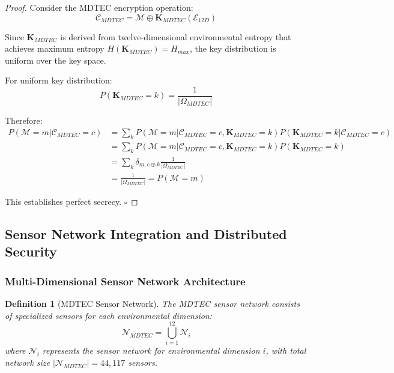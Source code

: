 \documentclass[12pt,a4paper]{article}
\newtheorem{definition}{Definition}
\begin{document}
\begin{proof}
Consider the MDTEC encryption operation:
\begin{equation}
\mathcal{C}_{MDTEC} = \mathcal{M} \oplus \mathbf{K}_{MDTEC}(\mathcal{E}_{12D})
\end{equation}

Since $\mathbf{K}_{MDTEC}$ is derived from twelve-dimensional environmental entropy that achieves maximum entropy $H(\mathbf{K}_{MDTEC}) = H_{max}$, the key distribution is uniform over the key space.

For uniform key distribution:
\begin{equation}
P(\mathbf{K}_{MDTEC} = k) = \frac{1}{|\Omega_{MDTEC}|}
\end{equation}

Therefore:
\begin{align}
P(\mathcal{M} = m | \mathcal{C}_{MDTEC} = c) &= \sum_{k} P(\mathcal{M} = m | \mathcal{C}_{MDTEC} = c, \mathbf{K}_{MDTEC} = k) P(\mathbf{K}_{MDTEC} = k | \mathcal{C}_{MDTEC} = c) \\
&= \sum_{k} P(\mathcal{M} = m | \mathcal{C}_{MDTEC} = c, \mathbf{K}_{MDTEC} = k) P(\mathbf{K}_{MDTEC} = k) \\
&= \sum_{k} \delta_{m,c \oplus k} \frac{1}{|\Omega_{MDTEC}|} \\
&= \frac{1}{|\Omega_{MDTEC}|} = P(\mathcal{M} = m)
\end{align}

This establishes perfect secrecy. $\square$
\end{proof}

\subsection{Sensor Network Integration and Distributed Security}

\subsubsection{Multi-Dimensional Sensor Network Architecture}

\begin{definition}[MDTEC Sensor Network]
The MDTEC sensor network consists of specialized sensors for each environmental dimension:
\begin{equation}
\mathcal{N}_{MDTEC} = \bigcup_{i=1}^{12} \mathcal{N}_i
\end{equation}
where $\mathcal{N}_i$ represents the sensor network for environmental dimension $i$, with total network size $|\mathcal{N}_{MDTEC}| = 44,117$ sensors.
\end{definition}
\end{document}
